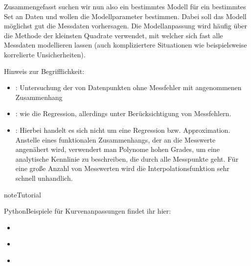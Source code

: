 \documentclass[letterpaper,10pt,english]{jupyterBook}
\begin{document}
\sphinxAtStartPar
Zusammengefasst suchen wir nun also ein bestimmtes Modell für ein bestimmtes Set an Daten und wollen die Modellparameter bestimmen. Dabei soll das Modell möglichst gut die Messdaten vorhersagen. Die Modellanpassung wird häufig über die Methode der kleinsten Quadrate verwendet, mit welcher sich fast alle Messdaten modellieren lassen (auch kompliziertere Situationen wie beispielsweise korrelierte Unsicherheiten).

\sphinxAtStartPar
Hinweis zur Begrifflichkeit:
\begin{itemize}
\item {} 
\sphinxAtStartPar
{}: Untersuchung der  von Datenpunkten ohne Messfehler mit angenommenen Zusammenhang

\item {} 
\sphinxAtStartPar
{}: wie die Regression, allerdings unter Berücksichtigung von Messfehlern.

\item {} 
\sphinxAtStartPar
{}: Hierbei handelt es sich nicht um eine Regression bzw. Approximation. Anstelle eines funktionalen Zusammenhangs, der an die Messwerte angenähert wird, verwendert man Polynome hohen Grades, um eine analytische Kennlinie zu beschreiben, die  durch alle Messpunkte geht. Für eine große Anzahl von Messwerten wird die Interpolationsfunktion sehr schnell unhandlich.

\end{itemize}

\sphinxAtStartPar
{}

\begin{sphinxadmonition}{note}{Tutorial}

\sphinxAtStartPar
Python\sphinxhyphen{}Beispiele für Kurvenanpassungen findet ihr hier:
\begin{itemize}
\item {} 
\sphinxAtStartPar
{\hyperref[\detokenize{content/T_LinReg::doc}]{}}

\item {} 
\sphinxAtStartPar
{\hyperref[\detokenize{content/T_FitmitFehlerbalken::doc}]{}}

\item {} 
\sphinxAtStartPar
{\hyperref[\detokenize{content/T_Plotten::doc}]{}}

\end{itemize}
\end{sphinxadmonition}
\end{document}
